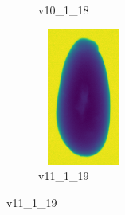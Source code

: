 \documentclass[11pt]{article}
\begin{document}
\begin{figure}
\begin{subfigure}[b]{0.15\textwidth}
        \caption{v10\_1\_18}
         \label{fig:five over x}
     \end{subfigure}
     \hfill
    \begin{subfigure}[b]{0.15\textwidth}
         \centering
         \includegraphics[width=3cm, height=4.5cm]{images/kartofler/v11_1_19_cut.png}
        \caption{v11\_1\_19}
         \label{fig:five over x}
     \end{subfigure}
\end{figure}





\newpage
\end{document}
